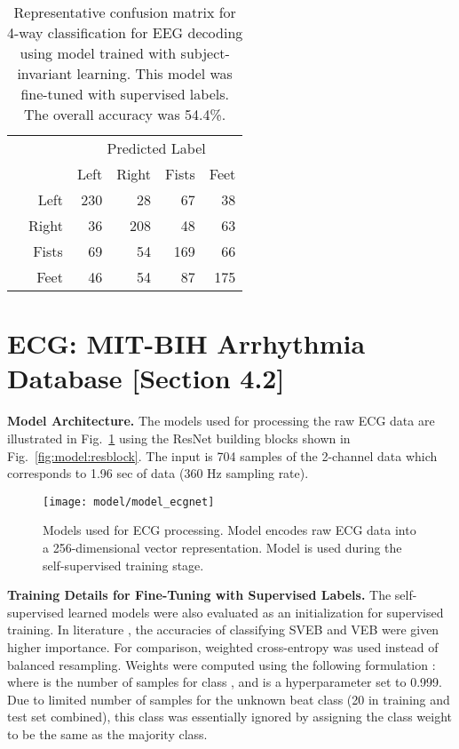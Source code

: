 \documentclass{article}
\renewcommand{\paragraph}[1]{\textbf{#1}\hspace{1em}}
\begin{document}
\begin{table}[H]
  \caption{Representative confusion matrix for 4-way classification for EEG
  decoding using model trained with subject-invariant learning. This model was
  fine-tuned with supervised labels. The overall accuracy was 54.4\%.}
  \label{table:eeg:confusion}
  \centering
  \begin{tabular}{rr|rrrr}
    \toprule
& & \multicolumn{4}{c}{Predicted Label} \\
    & & Left & Right & Fists & Feet \\
    \hline
    \parbox[t]{2mm}{}
    &  Left & 230 &  28 &  67 &  38 \\
    & Right &  36 & 208 &  48 &  63 \\
    & Fists &  69 &  54 & 169 &  66 \\
    &  Feet &  46 &  54 &  87 & 175 \\
    \bottomrule
  \end{tabular}
\end{table} \clearpage
\section{ECG: MIT-BIH Arrhythmia Database [Section 4.2]}

\paragraph{Model Architecture.} The models used for processing the raw ECG data
are illustrated in Fig.~\ref{fig:model:ecg} using the ResNet building blocks
shown in Fig.~\ref{fig:model:resblock}. The input is 704 samples of the
2-channel data which corresponds to 1.96 sec of data (360 Hz sampling
rate).

\begin{figure}[H]
  \centering
  \texttt{[image: model/model\_ecgnet]}
  \caption{Models used for ECG processing. Model  encodes raw ECG data into a
  256-dimensional vector representation. Model  is used during the
  self-supervised training stage.}
  \label{fig:model:ecg}
\end{figure}


\paragraph{Training Details for Fine-Tuning with Supervised Labels.}
The self-supervised learned models were also evaluated as an initialization for
supervised training. In literature
\cite{de_chazal_automatic_2004,huang_new_2014,garcia_inter-patient_2017,xu_towards_2019,niu_inter-patient_2019},
the accuracies of classifying SVEB and VEB were given higher importance. For
comparison, weighted cross-entropy was used \cite{niu_inter-patient_2019}
instead of balanced resampling. Weights were computed using the following
formulation \cite{cui_class-balanced_2019}: 
where  is the number of samples for class , and  is a
hyperparameter set to 0.999. Due to limited number of samples for the unknown
beat class (20 in training and test set combined), this class was essentially
ignored by assigning the class weight to be the same as the majority class.
\end{document}
